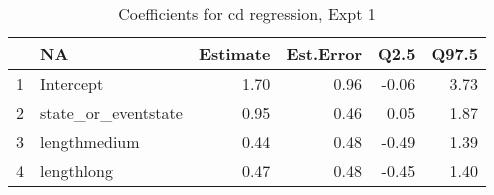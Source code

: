 \begin{table}[ht]
\centering
\begin{tabular}{rlrrrr}
  \hline
 & NA & Estimate & Est.Error & Q2.5 & Q97.5 \\ 
  \hline
1 & Intercept & 1.70 & 0.96 & -0.06 & 3.73 \\ 
  2 & state\_or\_eventstate & 0.95 & 0.46 & 0.05 & 1.87 \\ 
  3 & lengthmedium & 0.44 & 0.48 & -0.49 & 1.39 \\ 
  4 & lengthlong & 0.47 & 0.48 & -0.45 & 1.40 \\ 
   \hline
\end{tabular}
\caption{Coefficients for cd regression, Expt 1} 
\end{table}
